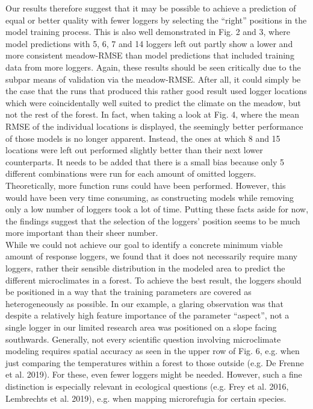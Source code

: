 \documentclass[5p]{elsarticle} %
\begin{document}
Our results therefore suggest that it may be possible to achieve a prediction of equal or better quality with fewer loggers by selecting the “right” positions in the model training process. This is also well demonstrated in Fig. 2 and 3, where model predictions with 5, 6, 7 and 14 loggers left out partly show a lower and more consistent meadow-RMSE than model predictions that included training data from more loggers. Again, these results should be seen critically due to the subpar means of validation via the meadow-RMSE. After all, it could simply be the case that the runs that produced this rather good result used logger locations which were coincidentally well suited to predict the climate on the meadow, but not the rest of the forest. In fact, when taking a look at Fig. 4, where the mean RMSE of the individual locations is displayed, the seemingly better performance of those models is no longer apparent. Instead, the ones at which 8 and 15 locations were left out performed slightly better than their next lower counterparts. It needs to be added that there is a small bias because only 5 different combinations were run for each amount of omitted loggers. Theoretically, more function runs could have been performed. However, this would have been very time consuming, as  constructing models while removing only a low number of loggers took a lot of time. Putting these facts aside for now, the findings suggest that the selection of the loggers’ position seems to be much more important than their sheer number.\\ 
While we could not achieve our goal to identify a concrete minimum viable amount of response loggers, we found that it does not necessarily require many loggers, rather their sensible distribution in the modeled area to predict the different microclimates in a forest. To achieve the best result, the loggers should be positioned in a way that the training parameters are covered as heterogeneously as possible. In our example, a glaring observation was that despite a relatively high feature importance of the parameter “aspect”, not a single logger in our limited research area was positioned on a slope facing southwards.
Generally, not every scientific question involving microclimate modeling requires spatial accuracy as seen in the upper row of Fig. 6, e.g. when just comparing the temperatures within a forest to those outside (e.g. De Frenne et al. 2019). For these, even fewer loggers might be needed. However, such a fine distinction is especially relevant in ecological questions (e.g. Frey et al. 2016, Lembrechts et al. 2019), e.g. when mapping microrefugia for certain species.\\
\end{document}
